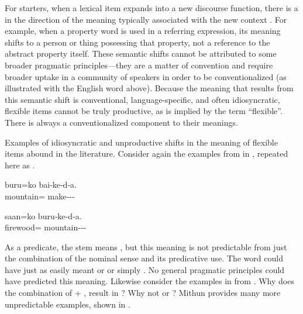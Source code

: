 For starters, when a lexical item expands into a new discourse function, there is a  in the direction of the meaning typically associated with the new context \parencites[74--77]{Croft1991}[73]{Croft2001b}. For example, when a property word is used in a referring expression, its meaning shifts to a person or thing possessing that property, not a reference to the abstract property itself. These semantic shifts cannot be attributed to some broader pragmatic principles—they are a matter of convention and require broader uptake in a community of speakers in order to be conventionalized (as illustrated with the English word  above). Because the meaning that results from this semantic shift is conventional, language-specific, and often idiosyncratic, flexible items cannot be truly productive, as is implied by the term \enquote{flexible}. There is always a conventionalized component to their meanings.

Examples of idiosyncratic and unproductive shifts in the meaning of flexible items abound in the literature. Consider again the examples from  in , repeated here as .

\begin{exe}
  \ex\label{ex:2.16}
  \begin{xlist}

    \ex
    \gll buru=ko                bai‑ke‑d‑a.\\
         mountain= make‑‑‑\\

    \ex
    \gll saan=ko                buru‑ke‑d‑a.\\
         firewood= mountain‑‑‑\\

  \end{xlist}
\end{exe}

\noindent As a predicate, the stem  means , but this meaning is not predictable from just the combination of the nominal sense  and its predicative use. The word could have just as easily meant  or  or simply . No general pragmatic principles could have predicted this meaning. Likewise consider the  examples in  from . Why does the combination of   +  ,  result in  ? Why not  or ? Mithun provides many more unpredictable examples, shown in .

